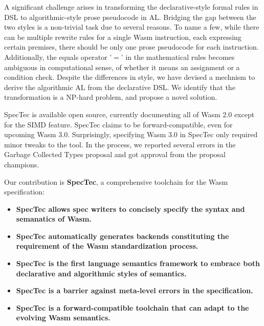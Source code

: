 A significant challenge arises in transforming the declarative-style formal rules in DSL to algorithmic-style prose pseudocode in AL.
Bridging the gap between the two styles is a non-trivial task due to several reasons. 
To name a few, while there can be multiple rewrite rules for a single Wasm instruction, each expressing certain premises, there should be only one prose pseudocode for each instruction. 
Additionally, the equals operator '$=$' in the mathematical rules becomes ambiguous in computational sense, of whether it means an assignment or a condition check.  
Despite the differences in style, we have devised a mechnism to derive the algorithmic AL from the declarative DSL. 
We identify that the transformation is a NP-hard problem, and propose a novel solution.

SpecTec is available open source, currently documenting all of Wasm 2.0 except for the SIMD feature. 
SpecTec claims to be forward-compatible, even for upcoming Wasm 3.0. 
Surprisingly, specifying Wasm 3.0 in SpecTec only required minor tweaks to the tool. 
In the process, we reported several errors in the Garbage Collected Types proposal and got approval from the proposal champions. 

Our contribution is \textbf{SpecTec}, a comprehensive toolchain for the Wasm specification:
\begin{itemize}
  \item 
    \textbf{SpecTec allows spec writers to concisely specify the syntax and semanatics of Wasm.} 
  \item 
    \textbf{SpecTec automatically generates backends constituting the requirement of the Wasm standardization process.}
  \item 
    \textbf{SpecTec is the first language semantics framework to embrace both declarative and algorithmic styles of semantics.}
  \item 
    \textbf{SpecTec is a barrier against meta-level errors in the specification.}
  \item 
    \textbf{SpecTec is a forward-compatible toolchain that can adapt to the evolving Wasm semantics.} 
\end{itemize}
